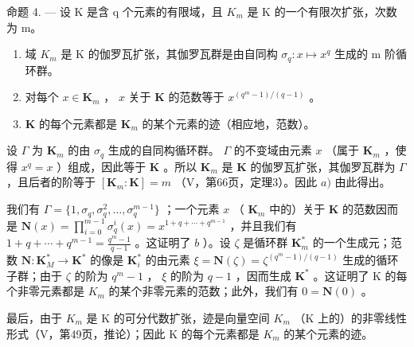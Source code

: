 命题 4. --- 设 K 是含 q 个元素的有限域，且 \(K_{m}\) 是 K 的一个有限次扩张，次数为 m。

\begin{enumerate}
\def\labelenumi{\alph{enumi})}
\item
  域 \(K_{m}\) 是 K 的伽罗瓦扩张，其伽罗瓦群是由自同构 \(\sigma_{q}: x \mapsto x^{q}\) 生成的 m 阶循环群。
\item
  对每个 \(x \in \mathbf{K}_m\) ， \(x\) 关于 \(\mathbf{K}\) 的范数等于 \(x^{(q^m - 1) / (q - 1)}\) 。
\item
  \(\mathbf{K}\) 的每个元素都是 \(\mathbf{K}_m\) 的某个元素的迹（相应地，范数）。
\end{enumerate}

设 \(\Gamma\) 为 \(\mathbf{K}_m\) 的由 \(\sigma_q\) 生成的自同构循环群。 \(\Gamma\) 的不变域由元素 \(x\) （属于 \(\mathbf{K}_m\) ，使得 \(x^q = x\) ）组成，因此等于 \(\mathbf{K}\) 。所以 \(\mathbf{K}_m\) 是 \(\mathbf{K}\) 的伽罗瓦扩张，其伽罗瓦群为 \(\Gamma\) ，且后者的阶等于 \([\mathbf{K}_m: \mathbf{K}] = m\) （V，第66页，定理3）。因此 \(a)\) 由此得出。

我们有 \(\Gamma = \{1, \sigma_q, \sigma_q^2, \ldots, \sigma_q^{m-1}\}\) ；一个元素 \(x\) （ \(\mathbf{K}_m\) 中的）关于 \(\mathbf{K}\) 的范数因而是 \(\mathbf{N}(x) = \prod_{i=0}^{m-1} \sigma_q^i(x) = x^{1+q+\cdots+q^{m-1}}\) ，并且我们有 \(1 + q + \cdots + q^{m-1} = \frac{q^m - 1}{q - 1}\) 。这证明了 \(b\) ）。设 \(\zeta\) 是循环群 \(\mathbf{K}_m^*\) 的一个生成元；范数 \(\mathbf{N}: \mathbf{K}_M^* \to \mathbf{K}^*\) 的像是 \(\mathbf{K}_i^*\) 的由元素 \(\xi = \mathbf{N}(\zeta) = \zeta^{(q^m - 1)/(q - 1)}\) 生成的循环子群；由于 \(\zeta\) 的阶为 \(q^m - 1\) ， \(\xi\) 的阶为 \(q - 1\) ，因而生成 \(\mathbf{K}^*\) 。这证明了 K 的每个非零元素都是 \(K_{m}\) 的某个非零元素的范数；此外，我们有 \(0 = \mathbf{N}(0)\) 。

最后，由于 \(K_{m}\) 是 K 的可分代数扩张，迹是向量空间 \(K_{m}\) （K 上的）的非零线性形式（V，第49页，推论）；因此 K 的每个元素都是 \(K_{m}\) 的某个元素的迹。
\relax{}
